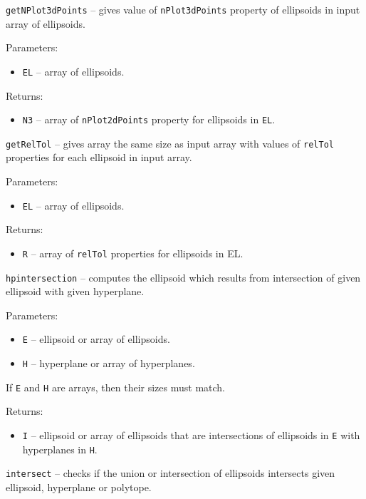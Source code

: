 {\Large {\tt getNPlot3dPoints}} -- gives value of {\tt nPlot3dPoints} property
of ellipsoids in input array of ellipsoids.

Parameters:
\begin{itemize}
\item {\tt EL} -- array of ellipsoids.
\end{itemize}

Returns:
\begin{itemize}
\item {\tt N3} -- array of {\tt nPlot2dPoints} property for ellipsoids
 in {\tt EL}.
\end{itemize}

\newpage

{\Large {\tt getRelTol}} -- gives array the same size as input array with values of {\tt relTol}
properties for each ellipsoid in input array.

Parameters:
\begin{itemize}
\item {\tt EL} -- array of ellipsoids.
\end{itemize}

Returns:
\begin{itemize}
\item {\tt R} -- array of {\tt relTol} properties for ellipsoids in EL.
\end{itemize}

\newpage

{\Large {\tt hpintersection}} -- computes the ellipsoid which results from
intersection of given ellipsoid with given hyperplane.

Parameters:
\begin{itemize}
\item {\tt E} -- ellipsoid or array of ellipsoids.
\item {\tt H} -- hyperplane or array of hyperplanes.
\end{itemize}
If {\tt E} and {\tt H} are arrays, then their sizes must match.

Returns:
\begin{itemize}
\item {\tt I} -- ellipsoid or array of ellipsoids that are intersections of
ellipsoids in {\tt E} with hyperplanes in {\tt H}.
\end{itemize}



\newpage

{\Large {\tt intersect}} -- checks if the union or intersection of ellipsoids
intersects given ellipsoid, hyperplane or polytope.

